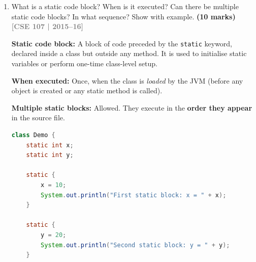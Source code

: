 \documentclass[12pt,a3paper]{article}
\newcommand{\yr}[1]{\hfill\textcolor{gray}{\small\textbf{[#1]}}}
\newcommand{\mk}[1]{\textcolor{orange!70!black}{\small\textbf{(#1 marks)}}}
\begin{document}
\begin{enumerate}
\begin{tcolorbox}
\textbf{Final method:} A method declared \texttt{final} cannot be
overridden in a subclass, but it \emph{can} be inherited and called.

\begin{lstlisting}[language=Java]
class Parent {
    final void display() { System.out.println("Parent display"); }
}
class Child extends Parent {
    // void display() { }  // compile error: cannot override final method
}
public class Main {
    public static void main(String[] args) {
        Child c = new Child();
        c.display();   // inherited fine; Output: Parent display
    }
}
\end{lstlisting}

\textit{Common use of \texttt{final} class: \texttt{java.lang.String}
is a final class --- it cannot be subclassed to prevent modification
of its behaviour.}

\end{tcolorbox}

\item What is a static code block? When is it executed? Can there be multiple static code blocks? In what sequence? Show with example. \mk{10}
\yr{CSE 107 | 2015--16}

\begin{tcolorbox}[enhanced,breakable,ansbox,
  colback=cD!4,colframe=cD,boxrule=0.8pt,arc=5pt,
  title={\textbf{Answer --- Static Code Block}},
  fonttitle=\bfseries\color{white},colbacktitle=cD]

\textbf{Static code block:} A block of code preceded by the
\texttt{static} keyword, declared inside a class but outside any
method.  It is used to initialise static variables or perform
one-time class-level setup.

\textbf{When executed:} Once, when the class is \emph{loaded} by the
JVM (before any object is created or any static method is called).

\textbf{Multiple static blocks:} Allowed.  They execute in the
\textbf{order they appear} in the source file.

\begin{lstlisting}[language=Java]
class Demo {
    static int x;
    static int y;

    static {
        x = 10;
        System.out.println("First static block: x = " + x);
    }

    static {
        y = 20;
        System.out.println("Second static block: y = " + y);
    }


\end{lstlisting}
\end{tcolorbox}
\end{enumerate}
\end{document}
